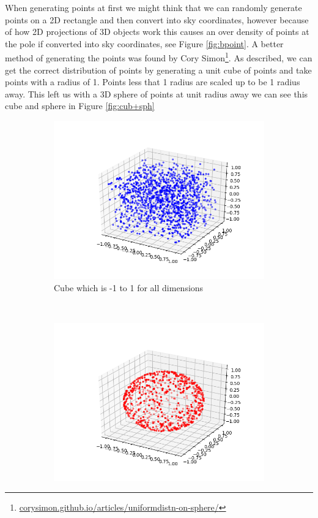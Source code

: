 \documentclass[a4paper, 10pt]{article}
\begin{document}
When generating points at first we might think that we can randomly generate points on a 2D rectangle and then convert into sky coordinates, however because of how 2D projections of 3D objects work this causes an over density of points at the pole if converted into sky coordinates, see Figure \ref{fig:bpoint}. A better method of generating the points was found by Cory Simon\footnote{\url{corysimon.github.io/articles/uniformdistn-on-sphere/}}. As described, we can get the correct distribution of points by generating a unit cube of points and take points with a radius of 1. Points less that 1 radius are scaled up to be 1 radius away. This left us with a 3D sphere of points at unit radius away we can see this cube and sphere in Figure \ref{fig:cub+sph}
\begin{figure}[H]
    \centering
    \begin{subfigure}[t]{0.5\textwidth}
        \centering
        \includegraphics[width=\textwidth, right]{cube1.png}
        \caption{Cube which is -1 to 1 for all dimensions}
    \end{subfigure}%
    ~ 
    \begin{subfigure}[t]{0.5\textwidth}
        \centering
        \includegraphics[width=\textwidth, left]{sphere1.png}

\end{subfigure}
\end{figure}
\end{document}
